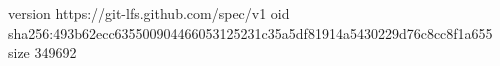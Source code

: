 version https://git-lfs.github.com/spec/v1
oid sha256:493b62ecc635500904466053125231c35a5df81914a5430229d76c8cc8f1a655
size 349692
